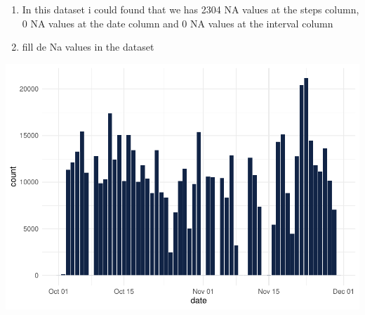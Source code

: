 \documentclass[
]{article}
\newenvironment{Shaded}{\begin{snugshade}}{\end{snugshade}}
\newcommand{\AttributeTok}[1]{\textcolor[rgb]{0.13,0.29,0.53}{#1}}
\newcommand{\FunctionTok}[1]{\textcolor[rgb]{0.13,0.29,0.53}{\textbf{#1}}}
\newcommand{\NormalTok}[1]{#1}
\newcommand{\OtherTok}[1]{\textcolor[rgb]{0.56,0.35,0.01}{#1}}
\newcommand{\SpecialCharTok}[1]{\textcolor[rgb]{0.81,0.36,0.00}{\textbf{#1}}}
\newcommand{\StringTok}[1]{\textcolor[rgb]{0.31,0.60,0.02}{#1}}
\begin{document}
\begin{enumerate}
\def\labelenumi{\arabic{enumi}.}
\item
  In this dataset i could found that we has 2304 NA values at the steps
  column, 0 NA values at the date column and 0 NA values at the interval
  column
\item
  fill de Na values in the dataset
\end{enumerate}

\begin{Shaded}
\end{Shaded}

\includegraphics{project1_files/figure-latex/unnamed-chunk-8-1.pdf}
\end{document}
